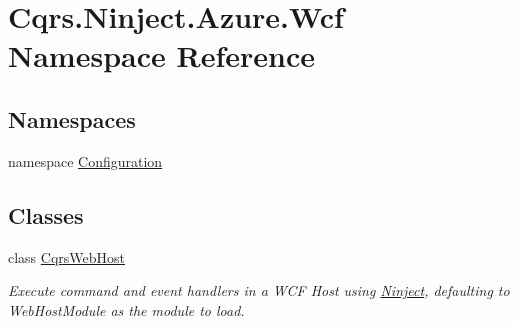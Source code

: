 \hypertarget{namespaceCqrs_1_1Ninject_1_1Azure_1_1Wcf}{}\section{Cqrs.\+Ninject.\+Azure.\+Wcf Namespace Reference}
\label{namespaceCqrs_1_1Ninject_1_1Azure_1_1Wcf}
\subsection*{Namespaces}
\begin{DoxyCompactItemize}
\item 
namespace \hyperlink{namespaceCqrs_1_1Ninject_1_1Azure_1_1Wcf_1_1Configuration}{Configuration}
\end{DoxyCompactItemize}
\subsection*{Classes}
\begin{DoxyCompactItemize}
\item 
class \hyperlink{classCqrs_1_1Ninject_1_1Azure_1_1Wcf_1_1CqrsWebHost}{Cqrs\+Web\+Host}
\begin{DoxyCompactList}\small\item\em Execute command and event handlers in a W\+CF Host using \hyperlink{namespaceCqrs_1_1Ninject}{Ninject}, defaulting to Web\+Host\+Module as the module to load. \end{DoxyCompactList}\end{DoxyCompactItemize}
